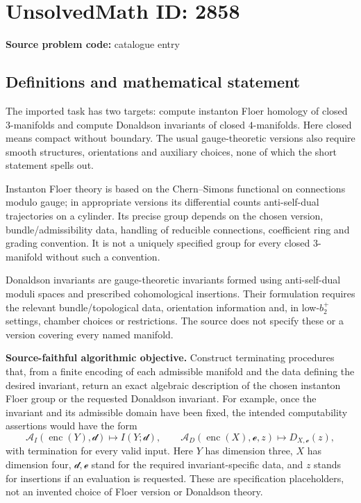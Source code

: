 \documentclass[11pt]{article}
\begin{document}
\section*{UnsolvedMath ID: 2858}
\textbf{Source problem code:} catalogue entry
\subsection{Definitions and mathematical statement}
The imported task has two targets: compute instanton Floer homology of closed $3$-manifolds and compute Donaldson invariants of closed $4$-manifolds. Here closed means compact without boundary. The usual gauge-theoretic versions also require smooth structures, orientations and auxiliary choices, none of which the short statement spells out.

Instanton Floer theory is based on the Chern--Simons functional on connections modulo gauge; in appropriate versions its differential counts anti-self-dual trajectories on a cylinder. Its precise group depends on the chosen version, bundle/admissibility data, handling of reducible connections, coefficient ring and grading convention. It is not a uniquely specified group for every closed $3$-manifold without such a convention.

Donaldson invariants are gauge-theoretic invariants formed using anti-self-dual moduli spaces and prescribed cohomological insertions. Their formulation requires the relevant bundle/topological data, orientation information and, in low-$b_2^+$ settings, chamber choices or restrictions. The source does not specify these or a version covering every named manifold.

\textbf{Source-faithful algorithmic objective.} Construct terminating procedures that, from a finite encoding of each admissible manifold and the data defining the desired invariant, return an exact algebraic description of the chosen instanton Floer group or the requested Donaldson invariant. For example, once the invariant and its admissible domain have been fixed, the intended computability assertions would have the form
\[
 \mathcal A_I(\operatorname{enc}(Y),\mathcal d)\longmapsto I(Y;\mathcal d),
 \qquad
 \mathcal A_D(\operatorname{enc}(X),\mathcal e,z)\longmapsto D_{X,\mathcal e}(z),
\]
with termination for every valid input. Here $Y$ has dimension three, $X$ has dimension four, $\mathcal d,\mathcal e$ stand for the required invariant-specific data, and $z$ stands for insertions if an evaluation is requested. These are specification placeholders, not an invented choice of Floer version or Donaldson theory.
\end{document}
